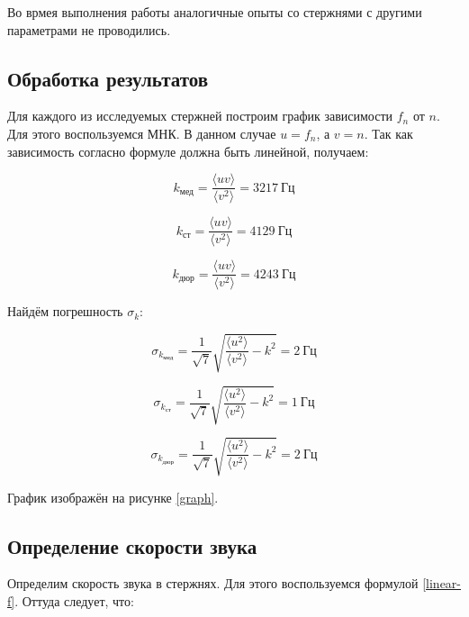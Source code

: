 \documentclass[a4paper,12pt]{article}
\begin{document}
Во врмея выполнения работы аналогичные опыты со стержнями с другими параметрами не проводились.

\subsection{Обработка результатов}

Для каждого из исследуемых стержней построим график зависимости $f_n$ от $n$. Для этого воспользуемся МНК. В данном случае $u = f_n$, а $v = n$. Так как зависимость согласно формуле должна быть линейной, получаем:

\begin{equation}
    k_\text{мед} = \frac{\langle uv\rangle}{\langle v^2 \rangle} = 3217 \ \text{Гц}
\end{equation}

\begin{equation}
    k_\text{ст} = \frac{\langle uv\rangle}{\langle v^2 \rangle} = 4129 \ \text{Гц}
\end{equation}

\begin{equation}
    k_\text{дюр} = \frac{\langle uv\rangle}{\langle v^2 \rangle} = 4243 \ \text{Гц}
\end{equation}

Найдём погрешность $\sigma_k$:

\begin{equation}
    \sigma_{k_\text{мед}} = \frac{1}{\sqrt{7}} \sqrt{\frac{\langle u^2 \rangle}{\langle v^2 \rangle} - k^2} = 2 \ \text{Гц}
\end{equation}

\begin{equation}
    \sigma_{k_\text{ст}} = \frac{1}{\sqrt{7}} \sqrt{\frac{\langle u^2 \rangle}{\langle v^2 \rangle} - k^2} = 1 \ \text{Гц}
\end{equation}

\begin{equation}
    \sigma_{k_\text{дюр}} = \frac{1}{\sqrt{7}} \sqrt{\frac{\langle u^2 \rangle}{\langle v^2 \rangle} - k^2} = 2 \ \text{Гц}
\end{equation}

График изображён на рисунке \ref{graph}.

\subsection{Определение скорости звука}

Определим скорость звука в стержнях. Для этого воспользуемся формулой \eqref{linear-f}. Оттуда следует, что:
\end{document}

